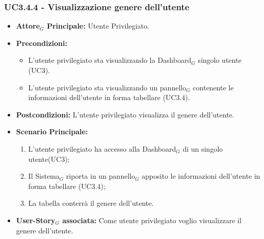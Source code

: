 \documentclass[10pt]{article}
\begin{document}
\begin{justify}
\subsubsection{\textbf{UC3.4.4 - Visualizzazione genere dell'utente}}
\label{UC3.4.4}
\begin{itemize}
     \item \textbf{Attore$_G$ Principale:} Utente Privilegiato.
     \item \textbf{Precondizioni:}
        \begin{itemize}
    	\item L'utente privilegiato sta visualizzando la Dashboard$_G$ singolo utente (UC3).
          \item L'utente privilegiato sta visualizzando un pannello$_G$ contenente le informazioni dell'utente in forma tabellare (UC3.4).
        \end{itemize}
      \item \textbf{Postcondizioni:} L'utente privilegiato visualizza il genere dell'utente.
      \item \textbf{Scenario Principale:}
        \begin{enumerate}
            \item L'utente privilegiato ha accesso alla Dashboard$_G$ di un singolo utente(UC3);
            \item Il Sistema$_G$ riporta  in un pannello$_G$ apposito le informazioni dell'utente in forma tabellare (UC3.4);
            \item La tabella conterrà il genere dell'utente.
        \end{enumerate}
     \item \textbf{User-Story$_G$ associata:}
       Come utente privilegiato voglio visualizzare il genere dell'utente.
\end{itemize}


\end{justify}
\end{document}
